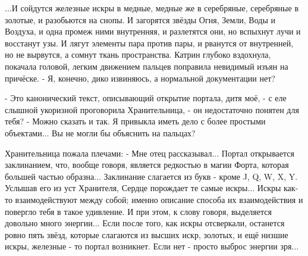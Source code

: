 ...И сойдутся железные искры в медные, медные же в серебряные, серебряные в золотые, и разобьются на снопы. И загорятся звёзды Огня, Земли, Воды и Воздуха, и одна промеж ними внутренняя, и разлетятся они, но вспыхнут лучи и восстанут узы. И лягут элементы пара против пары, и рванутся от внутренней, но не вырвутся, а сомнут ткань пространства.
Катрин глубоко вздохнула, покачала головой, легким движением пальцев поправила невидимый изъян на причёске.
- Я, конечно, дико извиняюсь, а нормальной документации нет?

- Это канонический текст, описывающий открытие портала, дитя моё, - с еле слышной укоризной проговорила Хранительница, - он недостаточно понятен для тебя?
- Можно сказать и так. Я привыкла иметь дело с более простыми объектами... Вы не могли бы объяснить на пальцах?

Хранительница пожала плечами:
- Мне отец рассказывал... Портал открывается заклинанием, что, вообще говоря, является редкостью в магии Форта, которая большей частью образна... Заклинание слагается из букв - кроме J, Q, W, X, Y. Услышав его из уст Хранителя, Сердце порождает те самые искры... Искры как-то взаимодействуют между собой; именно описание способа их взаимодействия и повергло тебя в такое удивление. И при этом, к слову говоря, выделяется довольно много энергии... Если после того, как искры отсверкали, останется ровно пять звёзд, которые слагаются из высших искр, золотых, и ещё низшие искры, железные - то портал возникнет. Если нет - просто выброс энергии зря...

